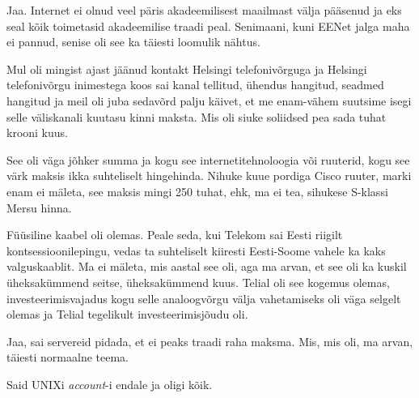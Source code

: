 
Jaa. Internet ei olnud veel päris akadeemilisest maailmast välja pääsenud ja eks seal kõik toimetasid akadeemilise traadi peal. Senimaani, kuni EENet jalga maha ei pannud, senise oli see ka täiesti  loomulik nähtus. 


Mul oli mingist ajast jäänud kontakt Helsingi telefonivõrguga ja Helsingi telefonivõrgu inimestega koos sai  kanal tellitud, ühendus hangitud, seadmed hangitud ja meil oli juba  sedavõrd palju käivet, et me enam-vähem suutsime isegi selle väliskanali kuutasu kinni maksta. Mis oli siuke soliidsed pea sada tuhat krooni kuus. 


See oli väga jõhker summa ja kogu see internetitehnoloogia või ruuterid,  kogu see värk maksis ikka suhteliselt hingehinda. Nihuke kuue pordiga Cisco ruuter, marki enam ei mäleta, see maksis mingi 250 tuhat, ehk, ma ei tea, sihukese  S-klassi Mersu hinna.


Füüsiline kaabel oli olemas. Peale seda, kui Telekom sai Eesti riigilt kontsessioonilepingu,  vedas ta suhteliselt kiiresti Eesti-Soome vahele ka kaks valguskaablit. Ma ei mäleta, mis aastal see oli, aga ma arvan, et see oli ka kuskil üheksakümmend seitse, üheksakümmend kuus. Telial oli see kogemus olemas, investeerimisvajadus kogu selle analoogvõrgu välja vahetamiseks oli väga selgelt olemas ja Telial tegelikult investeerimisjõudu oli. 


Jaa, sai servereid pidada, et ei peaks traadi raha maksma. Mis, mis oli, ma arvan, täiesti normaalne teema.


Said UNIXi \emph{account}-i endale ja oligi kõik.

